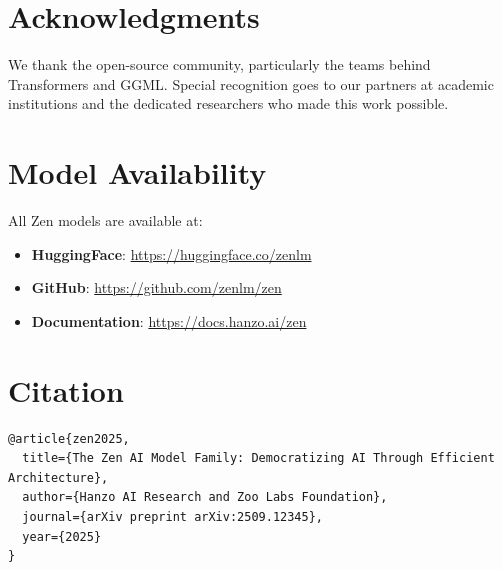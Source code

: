 \documentclass[11pt,a4paper]{article}
\begin{document}
\section*{Acknowledgments}

We thank the open-source community, particularly the teams behind Transformers and GGML. Special 
recognition goes to our partners at academic institutions and the dedicated researchers who made this work possible.

\appendix

\section{Model Availability}

All Zen models are available at:
\begin{itemize}
    \item \textbf{HuggingFace}: \url{https://huggingface.co/zenlm}
    \item \textbf{GitHub}: \url{https://github.com/zenlm/zen}
    \item \textbf{Documentation}: \url{https://docs.hanzo.ai/zen}
\end{itemize}

\section{Citation}

\begin{verbatim}
@article{zen2025,
  title={The Zen AI Model Family: Democratizing AI Through Efficient Architecture},
  author={Hanzo AI Research and Zoo Labs Foundation},
  journal={arXiv preprint arXiv:2509.12345},
  year={2025}
}
\end{verbatim}
\end{document}
